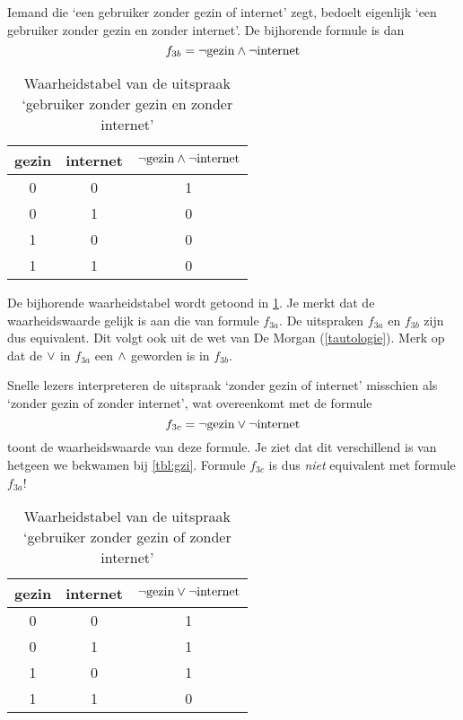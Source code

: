 Iemand die `een gebruiker zonder gezin of internet' zegt, bedoelt eigenlijk `een gebruiker zonder gezin en zonder internet'. De bijhorende formule is dan
\[
f_{3b}=\neg\mathrm{gezin}\wedge\neg \mathrm{internet}
\]
\begin{table}
\centering
\caption{Waarheidstabel van de uitspraak `gebruiker zonder gezin en zonder internet'}
\label{tbl:gzibis}
\begin{tabular}{ccc}
\toprule
gezin&internet&$\neg\mathrm{gezin}\wedge\neg \mathrm{internet}$\\
\midrule
0&0&1\\
0&1&0\\
1&0&0\\
1&1&0\\
\bottomrule
\end{tabular}
\end{table}
De bijhorende waarheidstabel wordt getoond in \cref{tbl:gzibis}. Je merkt dat de waarheidswaarde gelijk is aan die van formule $f_{3a}$. De uitspraken  $f_{3a}$ en $f_{3b}$ zijn dus equivalent.
Dit volgt ook uit de wet van De Morgan (\cref{tautologie}). Merk op dat de $\vee$ in $f_{3a}$ een $\wedge$ geworden is in $f_{3b}$.

Snelle lezers interpreteren de uitspraak `zonder gezin of internet' misschien als `zonder gezin of zonder internet', wat overeenkomt met de formule
\[
f_{3c}=\neg\mathrm{gezin}\vee\neg \mathrm{internet}
\]
 toont de waarheidswaarde van deze formule. Je ziet dat dit verschillend is van hetgeen we bekwamen bij \cref{tbl:gzi}. Formule $f_{3c}$ is dus \emph{niet} equivalent met formule $f_{3a}$!
\begin{table}
\caption{Waarheidstabel van de uitspraak `gebruiker zonder gezin of zonder internet'}
\label{tbl:gzifout}
\centering
\begin{tabular}{ccc}
\toprule
gezin&internet&$\neg\mathrm{gezin}\vee\neg \mathrm{internet}$\\
\midrule
0&0&1\\
0&1&1\\
1&0&1\\
1&1&0\\
\bottomrule
\end{tabular}
\end{table}

